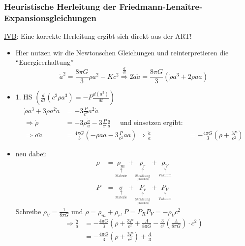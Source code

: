 \subsubsection{Heuristische Herleitung der Friedmann-Lena\^itre-Expansionsgleichungen}
\underline{IVB}: Eine korrekte Herleitung ergibt sich direkt aus der ART!
\begin{itemize}
	\item Hier nutzen wir die Newtonschen Gleichungen und reinterpretieren die "`Energieerhaltung"'
		\begin{equation*}
			\dot{a}^2=\frac{8\pi G}{3}{\rho}a^2-Kc^2\overset{\frac{d}{dt}}{\Rightarrow} 2\dot{a}\ddot{a}=\frac{8\pi G}{3}\left(\dot{\rho}a^3+2\rho a\dot{a}\right)
		\end{equation*}
	\item 1. HS $\left(\frac{d}{dt}\left(c^2\rho a^3\right)=-P\frac{d(a^3)}{dt}\right)$\\
		\begin{align*}
			\dot{\rho}a^3+3\rho a^2\dot{a}&=-3\frac{P}{c^2}a^2\dot{a}\\
			\Rightarrow \dot{\rho}&=-3\rho\frac{\dot{a}}{a}-3\frac{P}{c^2}\frac{\dot{a}}{a} \quad \text{ und einsetzen ergibt:}\\
			\Rightarrow \dot{a}\ddot{a}&=\frac{4\pi G}{3}\left(-\rho\dot{a}a-3\frac{P}{c^2}\dot{a} a\right)
			\Rightarrow \frac{\ddot{a}}{a}&=-\frac{4\pi G}{3}\left(\rho+\frac{3P}{c^2}\right)
		\end{align*}
	\item neu dabei:
		\begin{align*}
			\rho&=\underset{\underset{\text{Materie}}{\uparrow}}{\rho_m}+\underset{\underset{\underset{\text{(Photonen)}}{\text{Strahlung}}}{\uparrow}}{\rho_r}+\underset{\underset{\text{Vakuum}}{\uparrow}}{\rho_V}\\
			P&=\underset{\underset{\text{Materie}}{\uparrow}}{\sigma}+\underset{\underset{\underset{\text{(Photonen)}}{\text{Strahlung}}}{\uparrow}}{P_r}+\underset{\underset{\text{Vakuum}}{\uparrow}}{P_V}
		\end{align*}
		Schreibe $\rho_V=\frac{1}{8\pi G}$ und $\rho=\rho_m+\rho_r, P=P_R P_V=-\rho_Vc^2$
		\begin{align*}
			\Rightarrow \frac{\ddot{a}}{a}&=-\frac{4\pi G}{3}\left(\rho+\frac{3P}{c^2}+\frac{\Lambda}{8\pi G}-\frac{3}{c^2}\left(\frac{\Lambda}{8\pi G}\right)\cdot c^2\right)\\
			&=-\frac{4\pi G}{3}\left(\rho + \frac{3P}{c^2}\right)+\frac{\Lambda}{3}
		\end{align*}

\end{itemize}
